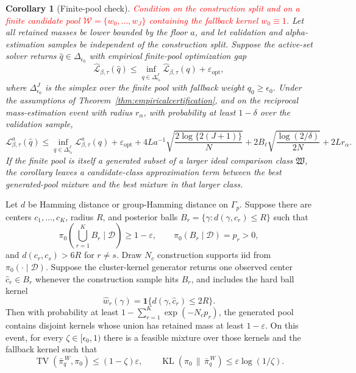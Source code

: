 \documentclass[twoside,11pt]{article}
\newtheorem{corollary}{Corollary}
\newcommand{\D}{\mathcal{D}}
\newcommand{\ind}{\mathbf{1}}
\newcommand{\TV}{\operatorname{TV}}
\newcommand{\KL}{\operatorname{KL}}
\newcommand{\rev}[1]{\textcolor{red}{#1}}
\begin{document}
\begin{corollary}[Finite-pool check]
\label{cor:endtoendcertification}
\rev{Condition on the construction split and on a finite candidate pool \(\mathcal W=\{w_0,\dots,w_J\}\) containing the fallback kernel \(w_0\equiv1\).} Let all retained masses be lower bounded by the floor \(a\), and let validation and alpha-estimation samples be independent of the construction split. Suppose the active-set solver returns \(\widehat q\in\Delta_{\epsilon_0}\) with empirical finite-pool optimization gap
\[
\widehat{\mathcal L}_{\beta,\tau}(\widehat q) \le \inf_{q\in\Delta_{\epsilon_0}^{J}} \widehat{\mathcal L}_{\beta,\tau}(q) + \varepsilon_{\mathrm{opt}},
\]
where \(\Delta_{\epsilon_0}^{J}\) is the simplex over the finite pool with fallback weight \(q_0\ge\epsilon_0\). Under the assumptions of Theorem~\ref{thm:empiricalcertification}, and on the reciprocal mass-estimation event with radius \(r_\alpha\), with probability at least \(1-\delta\) over the validation sample,
\[
\mathcal L_{\beta,\tau}^a(\widehat q) \le \inf_{q\in\Delta_{\epsilon_0}^{J}} \mathcal L_{\beta,\tau}^a(q) + \varepsilon_{\mathrm{opt}} + 4La^{-1}\sqrt{\frac{2\log\{2(J+1)\}}{N}} + 2B_\ell\sqrt{\frac{\log(2/\delta)}{2N}} + 2L r_\alpha .
\]
If the finite pool is itself a generated subset of a larger ideal comparison class \(\mathfrak W\), the corollary leaves a candidate-class approximation term between the best generated-pool mixture and the best mixture in that larger class.
\end{corollary}

\begin{theorem}
\label{thm:clustercoverage}
Let \(d\) be Hamming distance or group-Hamming distance on \(\Gamma_p\). Suppose there are centers \(c_1,\dots,c_K\), radius \(R\), and posterior balls \(B_r=\{\gamma:d(\gamma,c_r)\le R\}\) such that
\[
\pi_0\left(\bigcup_{r=1}^K B_r\mid\D\right)\ge1-\varepsilon, \qquad \pi_0(B_r\mid\D)=p_r>0,
\]
and \(d(c_r,c_s)>6R\) for \(r\ne s\). Draw \(N_c\) construction supports iid from \(\pi_0(\cdot\mid\D)\). Suppose the cluster-kernel generator returns one observed center \(\widehat c_r\in B_r\) whenever the construction sample hits \(B_r\), and includes the hard ball kernel
\[
\widehat w_r(\gamma)=\ind\{d(\gamma,\widehat c_r)\le2R\}.
\]
Then with probability at least \(1-\sum_{r=1}^K\exp(-N_c p_r)\), the generated pool contains disjoint kernels whose union has retained mass at least \(1-\varepsilon\). On this event, for every \(\zeta\in[\epsilon_0,1)\) there is a feasible mixture over those kernels and the fallback kernel such that
\[
\TV(\bar\pi_q^{\,W},\pi_0)\le(1-\zeta)\varepsilon, \qquad \KL(\pi_0\,\|\,\bar\pi_q^{\,W})\le\varepsilon\log(1/\zeta).
\]
\end{theorem}
\end{document}
